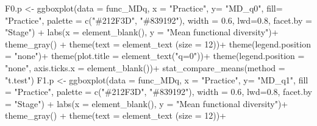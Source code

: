 \documentclass[]{interact}
\theoremstyle{plain}%
\theoremstyle{definition}
\theoremstyle{remark}
\newenvironment{Shaded}{\begin{snugshade}}{\end{snugshade}}
\newcommand{\AttributeTok}[1]{\textcolor[rgb]{0.77,0.63,0.00}{#1}}
\newcommand{\DecValTok}[1]{\textcolor[rgb]{0.00,0.00,0.81}{#1}}
\newcommand{\FloatTok}[1]{\textcolor[rgb]{0.00,0.00,0.81}{#1}}
\newcommand{\FunctionTok}[1]{\textcolor[rgb]{0.00,0.00,0.00}{#1}}
\newcommand{\NormalTok}[1]{#1}
\newcommand{\OtherTok}[1]{\textcolor[rgb]{0.56,0.35,0.01}{#1}}
\newcommand{\SpecialCharTok}[1]{\textcolor[rgb]{0.00,0.00,0.00}{#1}}
\newcommand{\StringTok}[1]{\textcolor[rgb]{0.31,0.60,0.02}{#1}}
\begin{document}
\begin{Shaded}
\begin{Highlighting}[]
\NormalTok{F0.p }\OtherTok{\textless{}{-}} \FunctionTok{ggboxplot}\NormalTok{(}\AttributeTok{data =}\NormalTok{ func\_MDq, }\AttributeTok{x =} \StringTok{"Practice"}\NormalTok{, }\AttributeTok{y=} \StringTok{"MD\_q0"}\NormalTok{,}
                \AttributeTok{fill=} \StringTok{"Practice"}\NormalTok{, }\AttributeTok{palette =} \FunctionTok{c}\NormalTok{(}\StringTok{"\#212F3D"}\NormalTok{, }\StringTok{"\#839192"}\NormalTok{), }
                \AttributeTok{width =} \FloatTok{0.6}\NormalTok{, }\AttributeTok{lwd=}\FloatTok{0.8}\NormalTok{, }\AttributeTok{facet.by =} \StringTok{"Stage"}\NormalTok{)  }\SpecialCharTok{+}
    \FunctionTok{labs}\NormalTok{(}\AttributeTok{x =} \FunctionTok{element\_blank}\NormalTok{(), }\AttributeTok{y =} \StringTok{"Mean functional diversity"}\NormalTok{)}\SpecialCharTok{+}
  \FunctionTok{theme\_gray}\NormalTok{() }\SpecialCharTok{+}
  \FunctionTok{theme}\NormalTok{(}\AttributeTok{text =} \FunctionTok{element\_text}\NormalTok{ (}\AttributeTok{size =} \DecValTok{12}\NormalTok{))}\SpecialCharTok{+}
  \FunctionTok{theme}\NormalTok{(}\AttributeTok{legend.position =} \StringTok{"none"}\NormalTok{)}\SpecialCharTok{+}
  \FunctionTok{theme}\NormalTok{(}\AttributeTok{plot.title =} \FunctionTok{element\_text}\NormalTok{(}\StringTok{"q=0"}\NormalTok{))}\SpecialCharTok{+}
  \FunctionTok{theme}\NormalTok{(}\AttributeTok{legend.position =} \StringTok{"none"}\NormalTok{,}
        \AttributeTok{axis.ticks.x =} \FunctionTok{element\_blank}\NormalTok{())}\SpecialCharTok{+}
  \FunctionTok{stat\_compare\_means}\NormalTok{(}\AttributeTok{method =} \StringTok{"t.test"}\NormalTok{)}
\NormalTok{F1.p }\OtherTok{\textless{}{-}} \FunctionTok{ggboxplot}\NormalTok{(}\AttributeTok{data =}\NormalTok{ func\_MDq, }\AttributeTok{x =} \StringTok{"Practice"}\NormalTok{, }\AttributeTok{y=} \StringTok{"MD\_q1"}\NormalTok{,}
                  \AttributeTok{fill =} \StringTok{"Practice"}\NormalTok{, }\AttributeTok{palette =} \FunctionTok{c}\NormalTok{(}\StringTok{"\#212F3D"}\NormalTok{, }\StringTok{"\#839192"}\NormalTok{), }
                  \AttributeTok{width =} \FloatTok{0.6}\NormalTok{, }\AttributeTok{lwd=}\FloatTok{0.8}\NormalTok{, }\AttributeTok{facet.by =} \StringTok{"Stage"}\NormalTok{)  }\SpecialCharTok{+}
  \FunctionTok{labs}\NormalTok{(}\AttributeTok{x =} \FunctionTok{element\_blank}\NormalTok{(), }\AttributeTok{y =} \StringTok{"Mean functional diversity"}\NormalTok{)}\SpecialCharTok{+}
  \FunctionTok{theme\_gray}\NormalTok{() }\SpecialCharTok{+}
  \FunctionTok{theme}\NormalTok{(}\AttributeTok{text =} \FunctionTok{element\_text}\NormalTok{ (}\AttributeTok{size =} \DecValTok{12}\NormalTok{))}\SpecialCharTok{+}

\end{Highlighting}
\end{Shaded}
\end{document}
